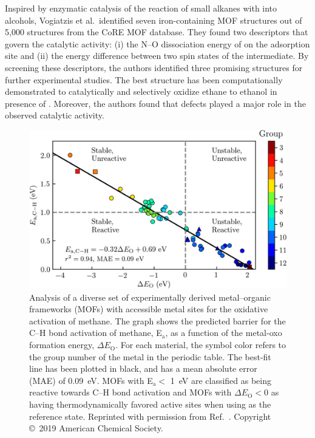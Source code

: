 \documentclass[main.tex]{subfiles}
\begin{document}
Inspired by enzymatic catalysis of the reaction of small alkanes with  into alcohols, Vogiatzis et al.\ identified  seven iron-containing MOF structures out of 5,000 structures from the CoRE MOF database.\autocite{Vogiatzis_2016} They found two descriptors that govern the catalytic activity: (i) the N--O dissociation energy of  on the adsorption site and (ii) the energy difference between two spin states of the intermediate.
By screening these descriptors, the authors identified three promising structures for further experimental studies. The best structure has been computationally demonstrated to catalytically and selectively oxidize ethane to ethanol in presence of . Moreover, the authors found that defects played a major role in the observed catalytic activity.

\begin{figure}[ht]
\centering
  \includegraphics[width=0.75\linewidth]{figures/1-screening/Rosen_2019.jpeg}
  \caption{Analysis of a diverse set of experimentally derived metal--organic frameworks (MOFs) with accessible metal sites for the oxidative activation of methane. The graph shows the predicted barrier for the C--H bond activation of methane, E$_\text{a}$, as a function of the metal-oxo formation energy, $\Delta E_\text{O}$. For each material, the symbol color refers to the group number of the metal in the periodic table. The best-fit line has been plotted in black, and has a mean absolute error (MAE) of \SI{0.09}{\eV}. MOFs with E$_\text{a}<$ \SI{1}{\eV} are classified as being reactive towards C--H bond activation and MOFs with $\Delta E_\text{O}<0$ as having thermodynamically favored active sites when using  as the reference state. Reprinted with permission from Ref.~\cite{Rosen_2019}. Copyright \copyright\  2019 American Chemical Society.}\label{fgr:Rosen_2019}
\end{figure}
\end{document}
